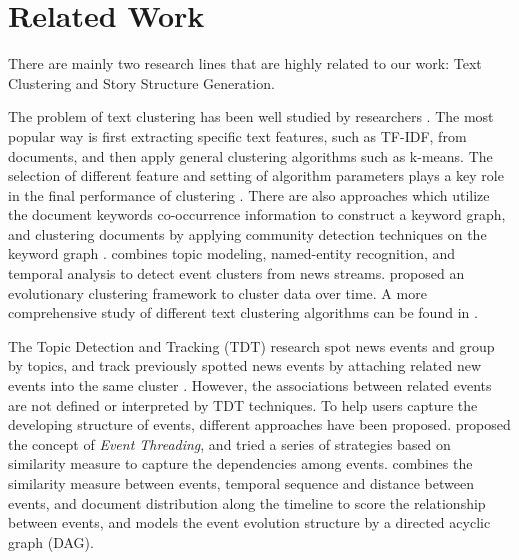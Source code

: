 \section{Related Work}
\label{sec:related}

There are mainly two research lines that are highly related to our work: Text Clustering and Story Structure Generation.



The problem of text clustering has been well studied by researchers \cite{aggarwal2012survey,jing2005subspace,jing2010knowledge,guan2011text}. The most popular way is first extracting specific text features, such as TF-IDF, from documents, and then apply general clustering algorithms such as k-means. The selection of different feature and setting of algorithm parameters plays a key role in the final performance of clustering \cite{liu2005comparative}. There are also approaches which utilize the document keywords co-occurrence information to construct a keyword graph, and clustering documents by applying community detection techniques on the keyword graph \cite{sayyadi2013graph}. \cite{Mele2017Event} combines topic modeling, named-entity recognition, and temporal analysis to detect event clusters from news streams. \cite{Chakrabarti2010Evolutionary} proposed an evolutionary clustering framework to cluster data over time. A more comprehensive study of different text clustering algorithms can be found in \cite{aggarwal2012survey}.




The Topic Detection and Tracking (TDT) research spot news events and group by topics, and track previously spotted news events by attaching related new events into the same cluster \cite{allan1998line,allan2012topic,yang2009discovering,sayyadi2013graph}. However, the associations between related events are not defined or interpreted by TDT techniques. 
To help users capture the developing structure of events, different approaches have been proposed. \cite{nallapati2004event} proposed the concept of \textit{Event Threading}, and tried a series of strategies based on similarity measure to capture the dependencies among events. \cite{yang2009discovering} combines the similarity measure between events, temporal sequence and distance between events, and document distribution along the timeline to score the relationship between events, and models the event evolution structure by a directed acyclic graph (DAG). 

